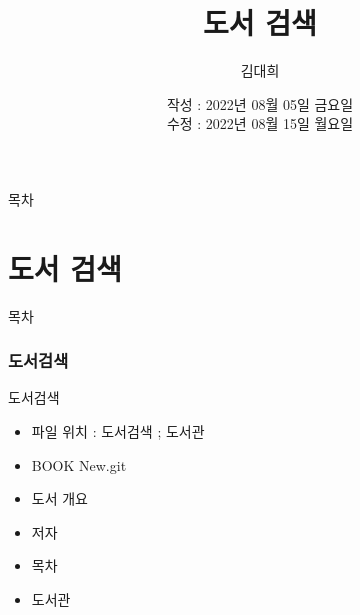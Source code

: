 \documentclass[aspectratio=1610,17pt,xcolor=pdftex,dvipsnames,table,handout]{beamer}
\begin{document}
	

			\title{도서 검색}

			\author{김대희}

			\date{ 	작성 : 2022년 08월 05일 금요일 \\
					수정 : 2022년 08월 15일 월요일  }








		\setcounter{tocdepth}{1}


		\begin{frame}[plain]
		\titlepage
		\end{frame}



		\begin{frame} {목차}
		\tableofcontents
		\end{frame}

		\part{도서 검색 }
		\frame{\partpage}


		\begin{frame} [plain]{목차}
		\tableofcontents
		\end{frame}
		

		\section{도서검색}
		

		\begin{frame} [t,plain]
			\begin{block} {도서검색}
			\begin{itemize}
				\item 파일 위치 : 도서검색 ; 도서관
				\item BOOK New.git
				\item 도서 개요
				\item 저자
				\item 목차
				\item 도서관
			\end{itemize}
			\end{block}
		\end{frame}
\end{document}
